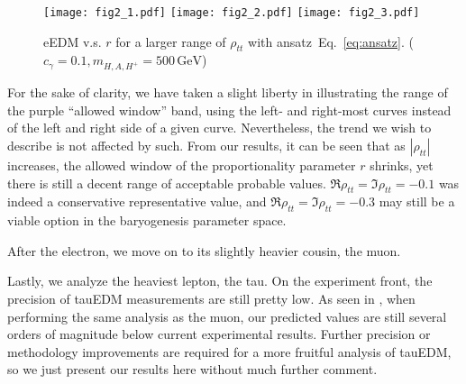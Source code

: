 \begin{figure}[t]
    \centering
    \texttt{[image: fig2\_1.pdf]}
    \texttt{[image: fig2\_2.pdf]}
    \texttt{[image: fig2\_3.pdf]}
    \caption{eEDM v.s. \(r \) for a larger range of \(\rho_{tt} \) with ansatz~Eq.~\eqref{eq:ansatz}. (\(c_{\gamma} = 0.1, m_{H, A, H^+} = 500\,\mathrm{GeV} \))}
    \label{fig:eEDM}
\end{figure}

For the sake of clarity, we have taken a slight liberty in illustrating the range of the purple ``allowed window'' band,
using the left- and right-most curves instead of the left and right side of a given curve.
Nevertheless, the trend we wish to describe is not affected by such.
From our results, it can be seen that as \(|\rho_{tt}| \) increases, the allowed window of the proportionality parameter \(r \) shrinks, yet there is still a decent range of acceptable probable values.
\(\Re\rho_{tt} = \Im\rho_{tt} = -0.1 \) was indeed a conservative representative value, and \(\Re\rho_{tt} = \Im\rho_{tt} = -0.3 \) may still be a viable option in the baryogenesis parameter space.

After the electron, we move on to its slightly heavier cousin, the muon. 

Lastly, we analyze the heaviest lepton, the tau. 
On the experiment front, the precision of tauEDM measurements are still pretty low.
As seen in , when performing the same analysis as the muon, our predicted values are still several orders of magnitude below current experimental results.
Further precision or methodology improvements are required for a more fruitful analysis of tauEDM, so we just present our results here without much further comment.
